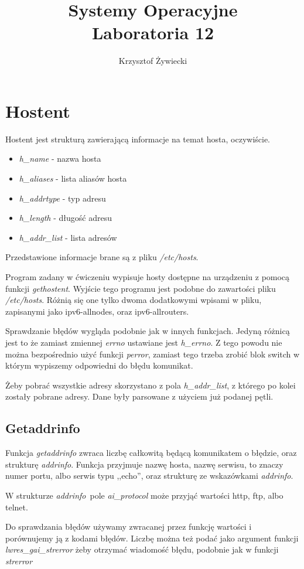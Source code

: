 \documentclass[a4paper, 11pt]{article}
\title{Systemy Operacyjne\\
	\Large{Laboratoria 12}}
\author{Krzysztof Żywiecki}
\newcommand{\entry}[2]{\item\emph{#1} - #2}
\newcommand{\addrinfo}{\emph{addrinfo}}
\begin{document}
\maketitle

\section*{Hostent}

Hostent jest strukturą zawierającą informacje na temat hosta, oczywiście.
\begin{itemize}
	\entry{h\_name}{nazwa hosta}
	\entry{h\_aliases}{lista aliasów hosta}
	\entry{h\_addrtype}{typ adresu}
	\entry{h\_length}{długość adresu}
	\entry{h\_addr\_list}{lista adresów}
\end{itemize}
Przedstawione informacje brane są z pliku \emph{/etc/hosts}.

Program zadany w ćwiczeniu wypisuje hosty dostępne na urządzeniu z pomocą funkcji \emph{gethostent}. Wyjście tego programu jest podobne do zawartości pliku \emph{/etc/hosts}. Różnią się one tylko dwoma dodatkowymi wpisami w pliku, zapisanymi jako ipv6-allnodes, oraz ipv6-allrouters.

Sprawdzanie błędów wygląda podobnie jak w innych funkcjach. Jedyną różnicą jest to że zamiast zmiennej \emph{errno} ustawiane jest \emph{h\_errno}. Z tego powodu nie można bezpośrednio użyć funkcji \emph{perror}, zamiast tego trzeba zrobić blok switch w którym wypiszemy odpowiedni do błędu komunikat.

Żeby pobrać wszystkie adresy skorzystano z pola \emph{h\_addr\_list}, z którego po kolei zostały pobrane adresy. Dane były parsowane z użyciem już podanej pętli.

\subsection*{Getaddrinfo}

Funkcja \emph{getaddrinfo} zwraca liczbę całkowitą będącą komunikatem o błędzie, oraz strukturę \emph{addrinfo}. Funkcja przyjmuje nazwę hosta, nazwę serwisu, to znaczy numer portu, albo serwis typu ,,echo'', oraz strukturę ze wskazówkami \emph{addrinfo}.

W strukturze \addrinfo~pole \emph{ai\_protocol} może przyjąć wartości http, ftp, albo telnet.

Do sprawdzania błędów używamy zwracanej przez funkcję wartości i porównujemy ją z kodami błędów. Liczbę można też podać jako argument funkcji \emph{lwres\_gai\_strerror} żeby otrzymać wiadomość błędu, podobnie jak w funkcji \emph{strerror}
\end{document}
